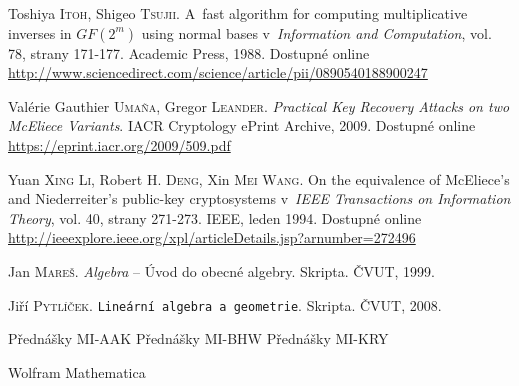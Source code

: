 \documentclass[thesis=M,czech,hidelinks]{FITthesis}[2012/06/26]
\newcommand{\0}{{\textcolor[gray]{0.75}{0}}}
\begin{document}
\begin{thebibliography}{99}
        Toshiya \textsc{Itoh}, Shigeo \textsc{Tsujii}. A~fast algorithm for
        computing multiplicative inverses in $GF(2^m)$ using normal bases
        v~\emph{Information and Computation}, vol. 78, strany 171-177. Academic
        Press, 1988.  Dostupné online
        \url{http://www.sciencedirect.com/science/article/pii/0890540188900247}

        Valérie Gauthier \textsc{Umaña}, Gregor \textsc{Leander}.
        \emph{Practical Key Recovery Attacks on two McEliece Variants}.
        IACR Cryptology ePrint Archive, 2009.  Dostupné online
        \url{https://eprint.iacr.org/2009/509.pdf}

        Yuan \textsc{Xing Li}, Robert H. \textsc{Deng}, Xin \textsc{Mei Wang}.
        On the equivalence of McEliece's and Niederreiter's public-key
        cryptosystems v~\emph{IEEE Transactions on Information Theory}, vol. 40,
        strany 271-273. IEEE, leden 1994. Dostupné online
        \url{http://ieeexplore.ieee.org/xpl/articleDetails.jsp?arnumber=272496}

        Jan \textsc{Mareš}. \emph{Algebra} -- Úvod do obecné algebry. Skripta.
        ČVUT, 1999.

        Jiří \textsc{Pytlíček}. \texttt{Lineární algebra a geometrie}. Skripta.
        ČVUT, 2008.

     Přednášky MI-AAK
     Přednášky MI-BHW
     Přednášky MI-KRY

     Wolfram Mathematica
\end{thebibliography}

\appendix

\end{document}
